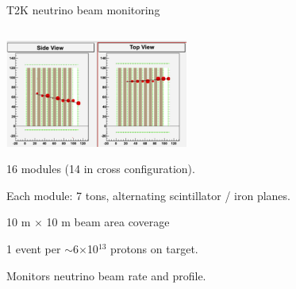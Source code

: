 \begin{frame}{T2K neutrino beam monitoring}
\begin{columns}
\begin{column}{0.65\textwidth}
     \includegraphics[width=0.45\textwidth]{./images/3nu/accelerator/t2k/INGRID_event_display_1.png}
     \begin{itemize}
       {\small
        \item 16 modules (14 in cross configuration).
        \item Each module: 7 tons, alternating scintillator / iron planes.
        \item 10 m $\times$ 10 m beam area coverage
        \item 1 event per $\sim$6$\times$10$^{13}$ protons on target.
        \item Monitors neutrino beam rate and profile.
        }
     \end{itemize}
  \end{column}
\end{columns}
\end{frame}


